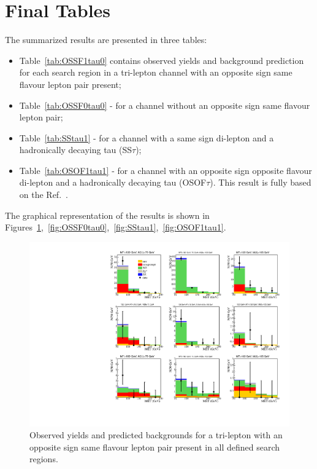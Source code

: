 \section{Final Tables}
The summarized results are presented in three tables: 
\begin{itemize}
\item Table~\ref{tab:OSSF1tau0} contains observed yields  and background prediction 
for each search region in a tri-lepton channel with an opposite sign same flavour lepton pair present;
\item Table~\ref{tab:OSSF0tau0}  - for a channel without  an opposite sign same flavour lepton pair;
\item Table~\ref{tab:SStau1} - for a channel with a same sign di-lepton and a hadronically decaying tau (SS$\tau$);
\item Table~\ref{tab:OSOF1tau1} - for a channel with an opposite sign opposite flavour di-lepton and a hadronically decaying tau (OSOF$\tau$). This result is fully based on the Ref.~\cite{AN2012:255}.
\end{itemize}

The graphical representation of the results is shown in Figures~\ref{fig:OSSF1tau0},~\ref{fig:OSSF0tau0},~\ref{fig:SStau1},~\ref{fig:OSOF1tau1}.

\begin{figure}[htp]
\begin{center}
\includegraphics[width=1.0\textwidth]{plots/ossf1tau0.pdf}
\caption{Observed yields and predicted backgrounds for a tri-lepton with an opposite sign same flavour lepton pair present in all defined search regions.}
\label{fig:OSSF1tau0}
\end{center}
\end{figure}

